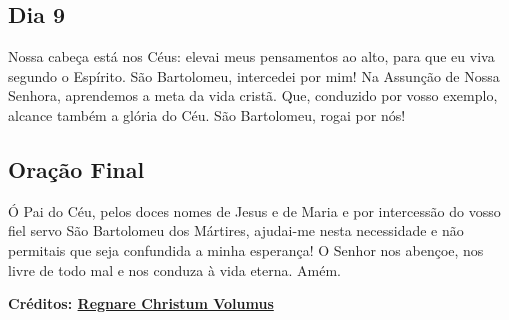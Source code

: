 \documentclass[18pt]{article}
\begin{document}
\begin{justify}
\begin{center}
  \subsection*{Dia 9}
\end{center}


Nossa cabeça está nos Céus: elevai meus pensamentos ao alto, para que eu viva segundo o Espírito. São Bartolomeu, intercedei por mim!
Na Assunção de Nossa Senhora, aprendemos a meta da vida cristã. Que, conduzido por vosso exemplo, alcance também a glória do Céu. São Bartolomeu, rogai por nós!

\end{justify}

\newpage
\begin{center}
  \section*{Oração Final}
\end{center}
\begin{justify}
Ó Pai do Céu, pelos doces nomes de Jesus e de Maria e por intercessão do vosso fiel servo São Bartolomeu dos Mártires, ajudai-me nesta necessidade e não permitais que seja confundida a minha esperança! O Senhor nos abençoe, nos livre de todo mal e nos conduza à vida eterna. Amém.
\end{justify}


\vfill

\begin{center}
  \textbf{Créditos: \href{https://www.nadateespante.com/products/novena-ao-beato-bartolomeu-dos-martires/}{Regnare Christum Volumus}}
\end{center}
\end{document}
